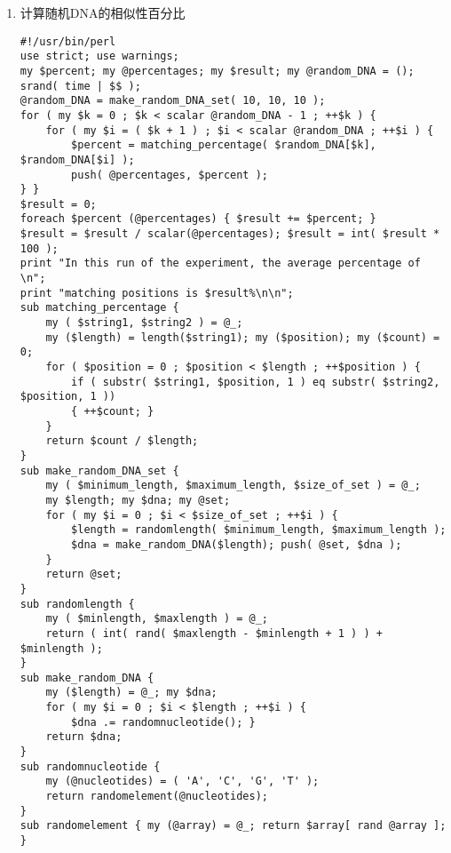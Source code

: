 \documentclass{TIJMUjiaoanSY}
\begin{document}
\begin{enumerate}
\begin{enumerate}
      \item 计算随机DNA的相似性百分比
\begin{verbatim}
#!/usr/bin/perl
use strict; use warnings;
my $percent; my @percentages; my $result; my @random_DNA = ();
srand( time | $$ );
@random_DNA = make_random_DNA_set( 10, 10, 10 );
for ( my $k = 0 ; $k < scalar @random_DNA - 1 ; ++$k ) {
    for ( my $i = ( $k + 1 ) ; $i < scalar @random_DNA ; ++$i ) {
        $percent = matching_percentage( $random_DNA[$k], $random_DNA[$i] );
        push( @percentages, $percent );
} }
$result = 0;
foreach $percent (@percentages) { $result += $percent; }
$result = $result / scalar(@percentages); $result = int( $result * 100 );
print "In this run of the experiment, the average percentage of \n";
print "matching positions is $result%\n\n";
sub matching_percentage {
    my ( $string1, $string2 ) = @_;
    my ($length) = length($string1); my ($position); my ($count) = 0;
    for ( $position = 0 ; $position < $length ; ++$position ) {
        if ( substr( $string1, $position, 1 ) eq substr( $string2, $position, 1 ))
        { ++$count; }
    }
    return $count / $length;
}
sub make_random_DNA_set {
    my ( $minimum_length, $maximum_length, $size_of_set ) = @_;
    my $length; my $dna; my @set;
    for ( my $i = 0 ; $i < $size_of_set ; ++$i ) {
        $length = randomlength( $minimum_length, $maximum_length );
        $dna = make_random_DNA($length); push( @set, $dna );
    }
    return @set;
}
sub randomlength {
    my ( $minlength, $maxlength ) = @_;
    return ( int( rand( $maxlength - $minlength + 1 ) ) + $minlength );
}
sub make_random_DNA {
    my ($length) = @_; my $dna;
    for ( my $i = 0 ; $i < $length ; ++$i ) {
        $dna .= randomnucleotide(); }
    return $dna;
}
sub randomnucleotide {
    my (@nucleotides) = ( 'A', 'C', 'G', 'T' );
    return randomelement(@nucleotides);
}
sub randomelement { my (@array) = @_; return $array[ rand @array ]; }
\end{verbatim}
    \end{enumerate}
\end{enumerate}

\otherTail
\end{document}
